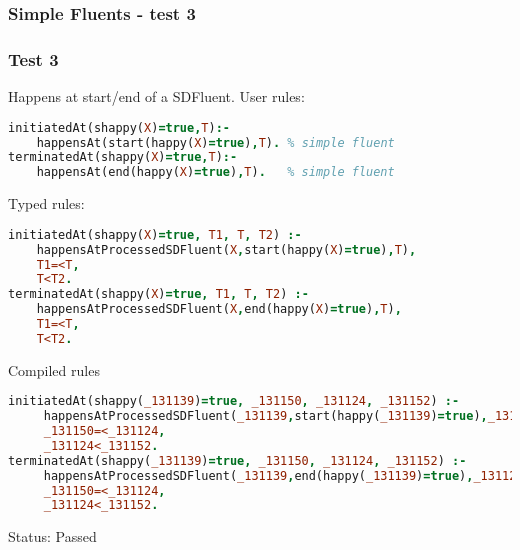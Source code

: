 \documentclass[8pt]{beamer}
\begin{document}
\begin{frame}[fragile]
\frametitle{Simple Fluents - test 3}
\subsubsection{Test 3}
\small
Happens at start/end of a SDFluent.\linebreak
User rules:
\begin{tiny}
\begin{lstlisting}[language=Prolog]
initiatedAt(shappy(X)=true,T):-
    happensAt(start(happy(X)=true),T). % simple fluent
terminatedAt(shappy(X)=true,T):-
    happensAt(end(happy(X)=true),T).   % simple fluent
\end{lstlisting}
\end{tiny}
Typed rules:
\begin{tiny}
\begin{lstlisting}[language=Prolog]
initiatedAt(shappy(X)=true, T1, T, T2) :-
    happensAtProcessedSDFluent(X,start(happy(X)=true),T),
    T1=<T,
    T<T2.
terminatedAt(shappy(X)=true, T1, T, T2) :-
    happensAtProcessedSDFluent(X,end(happy(X)=true),T),
    T1=<T,
    T<T2.
\end{lstlisting}
\end{tiny}
Compiled rules
\begin{tiny}
\begin{lstlisting}[language=Prolog]
initiatedAt(shappy(_131139)=true, _131150, _131124, _131152) :-
     happensAtProcessedSDFluent(_131139,start(happy(_131139)=true),_131124),
     _131150=<_131124,
     _131124<_131152.
terminatedAt(shappy(_131139)=true, _131150, _131124, _131152) :-
     happensAtProcessedSDFluent(_131139,end(happy(_131139)=true),_131124),
     _131150=<_131124,
     _131124<_131152.
\end{lstlisting}
\end{tiny}
Status: Passed
\end{frame}
\end{document}

